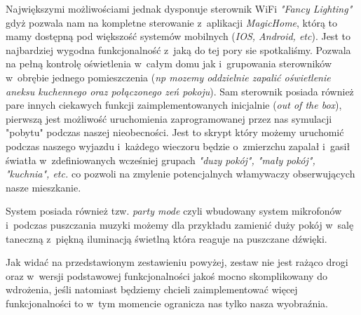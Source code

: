 \documentclass{xmgr}
\begin{document}
	Największymi możliwościami jednak dysponuje sterownik WiFi \emph{"Fancy Lighting"} gdyż pozwala nam na kompletne sterowanie z~aplikacji \emph{MagicHome}, którą to mamy dostępną pod większość systemów mobilnych (\emph{IOS, Android, etc}). Jest to najbardziej wygodna funkcjonalność z~jaką do tej pory sie spotkaliśmy. Pozwala na pełną kontrolę oświetlenia w~całym domu jak i~grupowania sterowników w~obrębie jednego pomieszczenia (\emph{np mozemy oddzielnie zapalić oświetlenie aneksu kuchennego oraz połączonego zeń pokoju}). Sam sterownik posiada również pare innych ciekawych funkcji zaimplementowanych inicjalnie (\emph{out of the box}), pierwszą jest możliwość uruchomienia zaprogramowanej przez nas symulacji "pobytu" podczas naszej nieobecności. Jest to skrypt który możemy uruchomić podczas naszego wyjazdu i~każdego wieczoru będzie o~zmierzchu zapalał i~gasił światła w~zdefiniowanych wcześniej grupach \emph{"duzy pokój", "mały pokój", "kuchnia", etc.} co pozwoli na zmylenie potencjalnych włamywaczy obserwujących nasze mieszkanie.

	System posiada również tzw. \emph{party mode} czyli wbudowany system mikrofonów i~podczas puszczania muzyki możemy dla przykładu zamienić duży pokój w~salę taneczną z~piękną iluminacją świetlną która reaguje na puszczane dźwięki.

	Jak widać na przedstawionym zestawieniu powyżej, zestaw nie jest rażąco drogi oraz w~wersji podstawowej funkcjonalności jakoś mocno skomplikowany do wdrożenia, jeśli natomiast będziemy chcieli zaimplementować więcej funkcjonalności to w~tym momencie ogranicza nas tylko nasza wyobraźnia.
\end{document}
